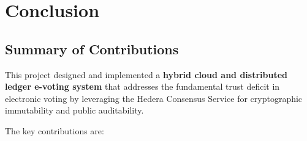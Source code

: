 \chapter{Conclusion}
\label{ch:conclusion}

\section{Summary of Contributions}
\label{sec:contributions}

This project designed and implemented a \textbf{hybrid cloud and distributed ledger
e-voting system} that addresses the fundamental trust deficit in electronic voting
by leveraging the Hedera Consensus Service for cryptographic immutability and
public auditability.

The key contributions are:


